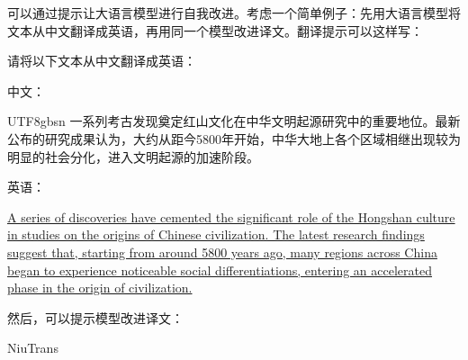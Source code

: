 可以通过提示让大语言模型进行自我改进。考虑一个简单例子：先用大语言模型将文本从中文翻译成英语，再用同一个模型改进译文。翻译提示可以这样写：

\vspace{0.5em}
\begin{tcolorbox}

\begingroup
\setlength{\leftskip}{2em}
\setlength{\rightskip}{2em}

请将以下文本从中文翻译成英语：

\vspace{0.5em}

中文：

\vspace{0.2em}

\begin{CJK*}{UTF8}{gbsn}
一系列考古发现奠定红山文化在中华文明起源研究中的重要地位。最新公布的研究成果认为，大约从距今5800年开始，中华大地上各个区域相继出现较为明显的社会分化，进入文明起源的加速阶段。
\end{CJK*}

\vspace{0.5em}

英语：

\vspace{0.2em}

\uline{A series of discoveries have cemented the significant role of the Hongshan culture in studies on the origins of Chinese civilization. The latest research findings suggest that, starting from around 5800 years ago, many regions across China began to experience noticeable social differentiations, entering an accelerated phase in the origin of civilization.}

\endgroup

\end{tcolorbox}
\vspace{0.5em}

然后，可以提示模型改进译文：

\vfill

{\color{white} NiuTrans}

